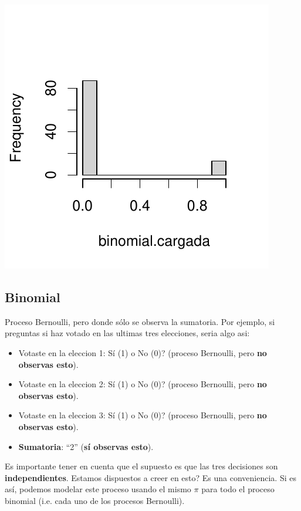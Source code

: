 \documentclass[onesided]{article}\usepackage[]{graphicx}\usepackage[]{color}
\makeatletter
\def\maxwidth{ %
  \ifdim\Gin@nat@width>\linewidth
    \linewidth
  \else
    \Gin@nat@width
  \fi
}
\newenvironment{knitrout}{}{} %
\makeatother
\begin{document}
\begin{knitrout}
{\centering \includegraphics[width=\maxwidth]{figure/bernoulli-2} 

}


\end{knitrout}


\subsection{Binomial}

Proceso Bernoulli, pero donde s\'olo se observa la sumatoria. Por ejemplo, si preguntas si haz votado en las ultimas tres elecciones, seria algo asi:

\begin{itemize}
	\item Votaste en la eleccion 1: {\color{red}S\'i} (1) o No (0)? (proceso Bernoulli, pero {\bf no observas esto}).
	\item Votaste en la eleccion 2: {\color{red}S\'i} (1) o No (0)? (proceso Bernoulli, pero {\bf no observas esto}).
	\item Votaste en la eleccion 3: S\'i (1) o {\color{red}No} (0)? (proceso Bernoulli, pero {\bf no observas esto}).
	\item {\bf Sumatoria}: ``2'' ({\bf s\'i observas esto}).
	\end{itemize}

Es importante tener en cuenta que el supuesto es que las tres decisiones son {\bf independientes}. {\color{red}Estamos dispuestos a creer en esto?} Es una conveniencia. Si es as\'i, podemos modelar este proceso usando el mismo $\pi$ para todo el proceso binomial (i.e. cada uno de los procesos Bernoulli).
\end{document}
